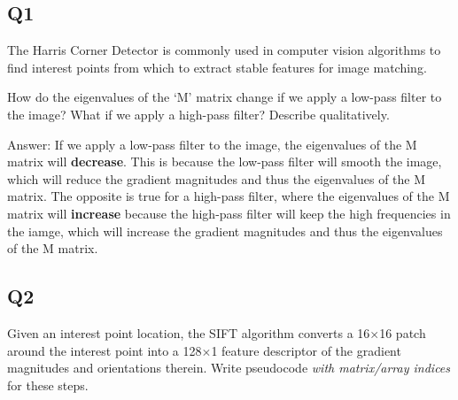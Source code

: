 \documentclass{article}
\begin{document}
\subsection{Q1} 
The Harris Corner Detector is commonly used in computer vision algorithms to find interest points from which to extract stable features for image matching. 

How do the eigenvalues of the `M' matrix change if we apply a low-pass filter to the image? What if we apply a high-pass filter? Describe qualitatively. 

Answer:
If we apply a low-pass filter to the image, the eigenvalues of the M matrix will \textbf{decrease}. This is because the low-pass filter will smooth the image, which will reduce the gradient magnitudes and thus the eigenvalues of the M matrix. The opposite is true for a high-pass filter, where the eigenvalues of the M matrix will \textbf{increase} because the high-pass filter will keep the high frequencies in the iamge, which will increase the gradient magnitudes and thus the eigenvalues of the M matrix.






\subsection{Q2} Given an interest point location, the SIFT algorithm converts a 16$\times$16 patch around the interest point into a 128$\times$1 feature descriptor of the gradient magnitudes and orientations therein. Write pseudocode \emph{with matrix/array indices} for these steps.
\end{document}
